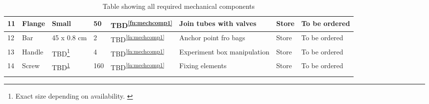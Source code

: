 \begin{longtable}{|m{}|m{}|m{}|m{}|m{}|m{}|m{}|m{}|}
11 & Flange & Small & 50 & TBD\textsuperscript{\ref{fn:mechcomp1}} & Join tubes with valves & Store & To be ordered \\ \hline
12 & Bar & 45 x 0.8 cm & 2 & TBD\textsuperscript{\ref{fn:mechcomp1}} & Anchor point fro bags & Store & To be ordered \\ \hline
13 & Handle & TBD\footnote{Exact size depending on availability. \label{fn:mechcomp2}} & 4 & TBD\textsuperscript{\ref{fn:mechcomp1}} & Experiment box manipulation & Store & To be ordered \\ \hline
14 & Screw & TBD\textsuperscript{\ref{fn:mechcomp2}} & 160 & TBD\textsuperscript{\ref{fn:mechcomp1}} & Fixing elements & Store & To be ordered \\ \hline

    \caption{Table showing all required mechanical components}
    \label{tab:mechanical-components}
\end{longtable}
\raggedbottom